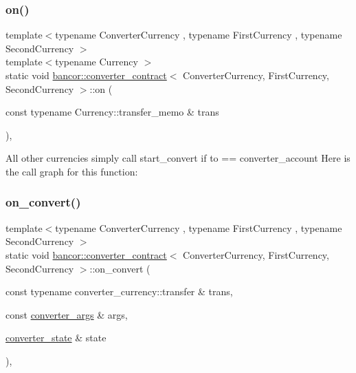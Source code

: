 \subsubsection{\texorpdfstring{on()}{on()}\hspace{0.1cm}{\footnotesize\ttfamily [2/2]}}
{\footnotesize\ttfamily template$<$typename Converter\+Currency , typename First\+Currency , typename Second\+Currency $>$ \\
template$<$typename Currency $>$ \\
static void \mbox{\hyperlink{classbancor_1_1converter__contract}{bancor\+::converter\+\_\+contract}}$<$ Converter\+Currency, First\+Currency, Second\+Currency $>$\+::on (\begin{DoxyParamCaption}\item[{const typename Currency\+::transfer\+\_\+memo \&}]{trans }\end{DoxyParamCaption})\hspace{0.3cm}{\ttfamily [inline]}, {\ttfamily [static]}}

All other currencies simply call start\+\_\+convert if to == converter\+\_\+account Here is the call graph for this function\+:
\mbox{\label{classbancor_1_1converter__contract_a606723604418ba5f0432493ba2ffd818}} 
\subsubsection{\texorpdfstring{on\+\_\+convert()}{on\_convert()}\hspace{0.1cm}{\footnotesize\ttfamily [1/2]}}
{\footnotesize\ttfamily template$<$typename Converter\+Currency , typename First\+Currency , typename Second\+Currency $>$ \\
static void \mbox{\hyperlink{classbancor_1_1converter__contract}{bancor\+::converter\+\_\+contract}}$<$ Converter\+Currency, First\+Currency, Second\+Currency $>$\+::on\+\_\+convert (\begin{DoxyParamCaption}\item[{const typename converter\+\_\+currency\+::transfer \&}]{trans,  }\item[{const \mbox{\hyperlink{structbancor_1_1converter__contract_1_1converter__args}{converter\+\_\+args}} \&}]{args,  }\item[{\mbox{\hyperlink{structbancor_1_1converter__contract_1_1converter__state}{converter\+\_\+state}} \&}]{state }\end{DoxyParamCaption})\hspace{0.3cm}{\ttfamily [inline]}, {\ttfamily [static]}}

